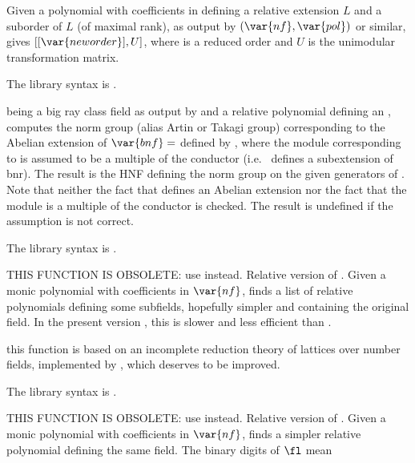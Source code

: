 \label{se:rnflllgram}
Given a polynomial
 with coefficients in  defining a relative extension $L$ and
a suborder  of $L$ (of maximal rank), as output by
$(\var{nf},\var{pol})$ or similar, gives
$[[\var{neworder}],U]$, where  is a reduced order and $U$ is
the unimodular transformation matrix.

The library syntax is .

\label{se:rnfnormgroup}
 being a big ray
class field as output by  and  a relative polynomial
defining an , computes the norm group (alias Artin
or Takagi group) corresponding to the Abelian extension of
$\var{bnf}=$
defined by , where the module corresponding to  is assumed
to be a multiple of the conductor (i.e.~ defines a subextension of
bnr). The result is the HNF defining the norm group on the given generators
of . Note that neither the fact that  defines an
Abelian extension nor the fact that the module is a multiple of the conductor
is checked. The result is undefined if the assumption is not correct.

The library syntax is .

\label{se:rnfpolred}
THIS FUNCTION IS OBSOLETE: use  instead.
Relative version of . Given a monic polynomial  with
coefficients in $\var{nf}$, finds a list of relative polynomials defining some
subfields, hopefully simpler and containing the original field. In the present
version \vers, this is slower and less efficient than .

 this function is based on an incomplete reduction
theory of lattices over number fields, implemented by , which
deserves to be improved.

The library syntax is .

\label{se:rnfpolredabs}
THIS FUNCTION IS OBSOLETE: use  instead.
Relative version of . Given a monic polynomial 
with coefficients in $\var{nf}$, finds a simpler relative polynomial defining
the same field. The binary digits of $\fl$ mean

